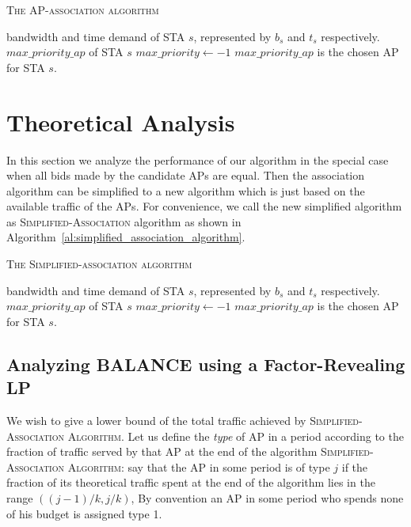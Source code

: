 \documentclass[conference]{IEEEtran}
\begin{document}
    \begin{algorithm}[htb]
    \caption{\textsc{The AP-association algorithm}}\label{al:ap_association_algorithm}
    \begin{algorithmic}[1]
        \REQUIRE bandwidth and time demand of STA $s$, represented by
        $b_s$ and $t_s$
        respectively.
        \ENSURE $max\_priority\_ap$ of STA $s$
        \STATE $max\_priority \leftarrow -1$
        \ENDIF
        \ENDFOR
        \STATE $max\_priority\_ap$ is the chosen AP for STA $s$.
    \end{algorithmic}
  \end{algorithm}



  \section{Theoretical Analysis}\label{sec:analysis}
  In this section we analyze the performance of our algorithm in the special case when all bids made by the candidate APs are equal.  Then the association algorithm can be simplified to a new  algorithm which is just based on the available traffic of the APs. For convenience, we call the new simplified algorithm as \textsc{Simplified-Association} algorithm as shown in Algorithm~\ref{al:simplified_association_algorithm}.

    \begin{algorithm}[htb]
    \caption{\textsc{The Simplified-association algorithm}}\label{al:simplified_association_algorithm}
    \begin{algorithmic}[1]
        \REQUIRE bandwidth and time demand of STA $s$, represented by
        $b_s$ and $t_s$
        respectively.
        \ENSURE $max\_priority\_ap$ of STA $s$
        \STATE $max\_priority \leftarrow -1$
        \ENDIF
        \ENDFOR
        \STATE $max\_priority\_ap$ is the chosen AP for STA $s$.
    \end{algorithmic}
  \end{algorithm}

  \subsection{Analyzing BALANCE using a Factor-Revealing LP}
  We wish to give a lower bound of the total traffic achieved  by {\scshape Simplified-Association Algorithm}.  Let us define the {\itshape type} of AP in a period according to the fraction of traffic served by that AP at the end of the algorithm {\scshape Simplified-Association Algorithm}: say that the AP in some period is of type $j$ if the fraction of its theoretical traffic spent at the end of the algorithm lies in the range $((j-1)/k,j/k)$,  By convention an AP in some period who spends none of his budget is assigned type 1.
\end{document}
